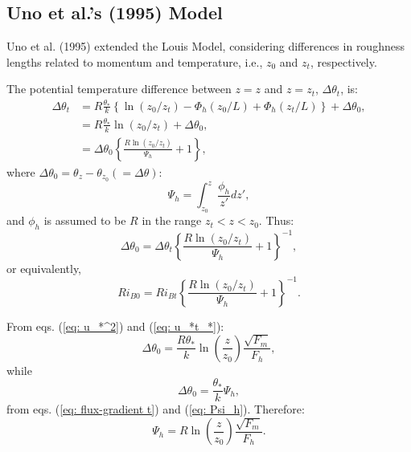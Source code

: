 \subsection{Uno et al.’s (1995) Model}
Uno et al. (1995) extended the Louis Model,
considering differences in roughness lengths related to momentum and temperature, i.e., $z_0$ and $z_t$, respectively.

The potential temperature difference between $z=z$ and $z=z_t$,
$\Delta\theta_t$, is:
\begin{align}
  \Delta\theta_t
  &= R\frac{\theta_*}{k}\left\{\ln(z_0/z_t) - \Phi_h(z_0/L) + \Phi_h(z_t/L)\right\} + \Delta\theta_0, \nonumber \\
  &= R\frac{\theta_*}{k}{\ln(z_0/z_t)} + \Delta\theta_0, \nonumber \\
  &= \Delta\theta_0 \left\{\frac{R\ln(z_0/z_t)}{\Psi_h} + 1\right\},
\end{align}
where $\Delta\theta_0 = \theta_z - \theta_{z_0} (=\Delta\theta)$:
\begin{equation}
  \Psi_h = \int_{z_0}^z\frac{\phi_h}{z'}dz', \label{eq: Psi_h}
\end{equation}
and $\phi_h$ is assumed to be $R$ in the range $z_t < z < z_0$.
Thus:
\begin{equation}
  \Delta\theta_0 = \Delta\theta_t \left\{\frac{R\ln(z_0/z_t)}{\Psi_h}+1\right\}^{-1},
  \label{eq: Delta t_0}
\end{equation}
or equivalently,
\begin{equation}
  Ri_{B0} = Ri_{Bt} \left\{\frac{R\ln(z_0/z_t)}{\Psi_h}+1\right\}^{-1}.
  \label{eq: Ri_B0}
\end{equation}

From eqs. (\ref{eq: u_*^2}) and (\ref{eq: u_*t_*}):
\begin{equation}
  \Delta\theta_0 = \frac{R\theta_*}{k}\ln\left(\frac{z}{z_0}\right)\frac{\sqrt{F_m}}{F_h},
\end{equation}
while
\begin{equation}
  \Delta\theta_0 = \frac{\theta_*}{k}\Psi_h,
\end{equation}
from eqs. (\ref{eq: flux-gradient t}) and (\ref{eq: Psi_h}).
Therefore:
\begin{equation}
  \Psi_h = R\ln\left(\frac{z}{z_0}\right)\frac{\sqrt{F_m}}{F_h}.
  \label{eq: Psi}
\end{equation}

